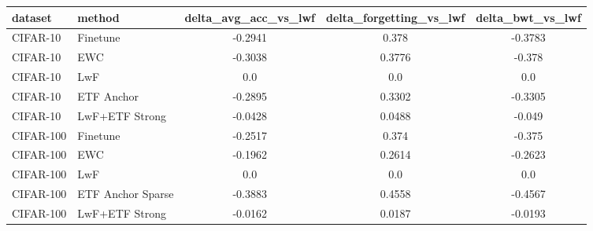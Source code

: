 \begin{tabular}{llccc}
\hline
dataset & method & delta\_avg\_acc\_vs\_lwf & delta\_forgetting\_vs\_lwf & delta\_bwt\_vs\_lwf \\
\hline
CIFAR-10 & Finetune & -0.2941 & 0.378 & -0.3783 \\
CIFAR-10 & EWC & -0.3038 & 0.3776 & -0.378 \\
CIFAR-10 & LwF & 0.0 & 0.0 & 0.0 \\
CIFAR-10 & ETF Anchor & -0.2895 & 0.3302 & -0.3305 \\
CIFAR-10 & LwF+ETF Strong & -0.0428 & 0.0488 & -0.049 \\
CIFAR-100 & Finetune & -0.2517 & 0.374 & -0.375 \\
CIFAR-100 & EWC & -0.1962 & 0.2614 & -0.2623 \\
CIFAR-100 & LwF & 0.0 & 0.0 & 0.0 \\
CIFAR-100 & ETF Anchor Sparse & -0.3883 & 0.4558 & -0.4567 \\
CIFAR-100 & LwF+ETF Strong & -0.0162 & 0.0187 & -0.0193 \\
\hline
\end{tabular}
